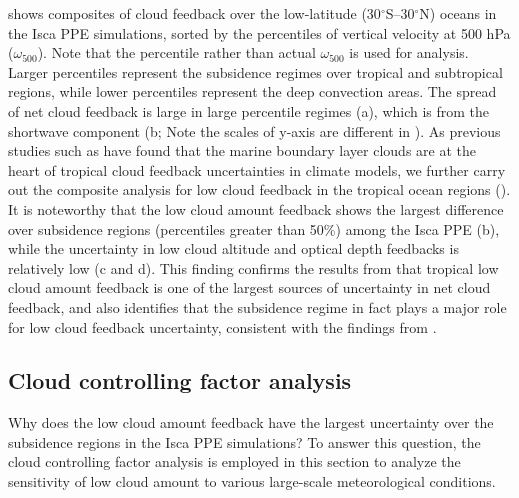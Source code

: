  shows composites of cloud feedback over the low-latitude (30$^\circ$S--30$^\circ$N) oceans in the Isca PPE simulations, sorted by the percentiles of vertical velocity at 500 hPa ($\omega_{500}$). Note that the percentile rather than actual $\omega_{500}$ is used for analysis. Larger percentiles represent the subsidence regimes over tropical and subtropical regions, while lower percentiles represent the deep convection areas. The spread of net cloud feedback is large in large percentile regimes (a), which is from the shortwave component (b; Note the scales of y-axis are different in ). As previous studies such as \cite{Bony2005} have found that the marine boundary layer clouds are at the heart of tropical cloud feedback uncertainties in climate models, we further carry out the composite analysis for low cloud feedback in the tropical ocean regions (). It is noteworthy that the low cloud amount feedback shows the largest difference  over subsidence regions (percentiles greater than 50\%) among the Isca PPE (b), while the uncertainty in low cloud altitude and optical depth feedbacks is relatively low (c and d). This finding confirms the results from  that tropical low cloud amount feedback is one of the largest sources of uncertainty in net cloud feedback, and also identifies that the subsidence regime in fact plays a major role for low cloud feedback uncertainty, consistent with the findings from \cite{Bony2005}.

\subsection{Cloud controlling factor analysis}
\label{sec:cld_control_factor}

Why does the low cloud amount feedback have the largest uncertainty over the subsidence regions in the Isca PPE simulations? To answer this question, the cloud controlling factor analysis \citep[e.g.,][]{Qu2015positive,Myers2016,McCoy2017change,Klein2017low,Scott2020,Myers2021,Cesana2021,Ceppi2021observational} is employed in this section to analyze the sensitivity of low cloud amount to various large-scale meteorological conditions.

